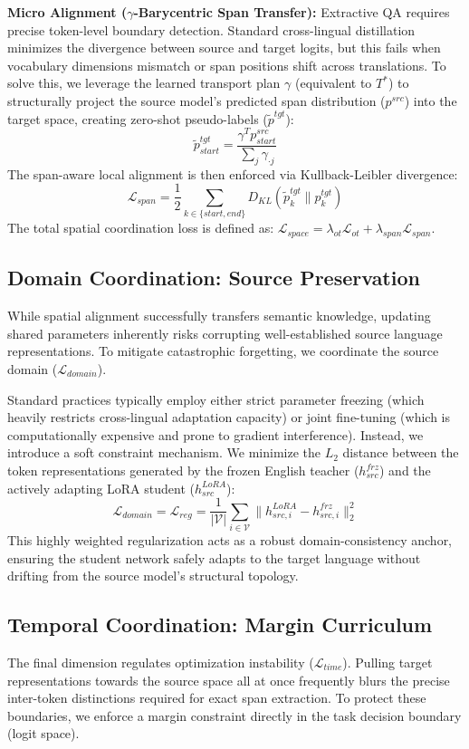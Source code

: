 \documentclass[11pt]{article}
\begin{document}
\textbf{Micro Alignment ($\gamma$-Barycentric Span Transfer):} Extractive QA requires precise token-level boundary detection. Standard cross-lingual distillation minimizes the divergence between source and target logits, but this fails when vocabulary dimensions mismatch or span positions shift across translations. To solve this, we leverage the learned transport plan $\gamma$ (equivalent to $T^*$) to structurally project the source model's predicted span distribution ($p^{src}$) into the target space, creating zero-shot pseudo-labels ($\tilde{p}^{tgt}$):
$$ \tilde{p}^{tgt}_{start} = \frac{\gamma^T p^{src}_{start}}{\sum_j \gamma_{\cdot j}} $$
The span-aware local alignment is then enforced via Kullback-Leibler divergence:
$$ \mathcal{L}_{span} = \frac{1}{2} \sum_{k \in \{start, end\}} D_{KL}(\tilde{p}^{tgt}_{k} \| p^{tgt}_{k}) $$
The total spatial coordination loss is defined as: $\mathcal{L}_{space} = \lambda_{ot}\mathcal{L}_{ot} + \lambda_{span}\mathcal{L}_{span}$.

\subsection{Domain Coordination: Source Preservation}
\label{sec:domain}
While spatial alignment successfully transfers semantic knowledge, updating shared parameters inherently risks corrupting well-established source language representations. To mitigate catastrophic forgetting, we coordinate the source domain ($\mathcal{L}_{domain}$).

Standard practices typically employ either strict parameter freezing (which heavily restricts cross-lingual adaptation capacity) or joint fine-tuning (which is computationally expensive and prone to gradient interference). Instead, we introduce a soft constraint mechanism. We minimize the $L_2$ distance between the token representations generated by the frozen English teacher ($h^{frz}_{src}$) and the actively adapting LoRA student ($h^{LoRA}_{src}$):
$$ \mathcal{L}_{domain} = \mathcal{L}_{reg} = \frac{1}{|\mathcal{V}|} \sum_{i \in \mathcal{V}} \| h^{LoRA}_{src,i} - h^{frz}_{src,i} \|^2_2 $$
This highly weighted regularization acts as a robust domain-consistency anchor, ensuring the student network safely adapts to the target language without drifting from the source model's structural topology.

\subsection{Temporal Coordination: Margin Curriculum}
\label{sec:temporal}
The final dimension regulates optimization instability ($\mathcal{L}_{time}$). Pulling target representations towards the source space all at once frequently blurs the precise inter-token distinctions required for exact span extraction. To protect these boundaries, we enforce a margin constraint directly in the task decision boundary (logit space).
\end{document}
